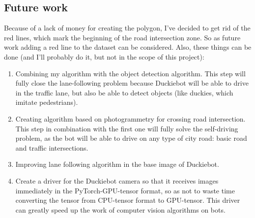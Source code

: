 \subsection{Future work}
Because of a lack of money for creating the polygon, I've decided to get rid of the red lines, which mark the beginning of the road intersection zone. So as future 
work adding a red line to the dataset can be considered. Also, these things can be done (and I'll probably do it, but not in the scope of this project):
\begin{enumerate}
    \item Combining my algorithm with the object detection algorithm. This step will fully close the lane-following problem because Duckiebot will be able to
    drive in the traffic lane, but also be able to detect objects (like duckies, which imitate pedestrians).
    \item Creating algorithm based on photogrammetry for crossing road intersection. This step in combination with the first one will fully solve the self-driving problem, 
    as the bot will be able to drive on any type of city road: basic road and traffic intersections.
    \item Improving lane following algorithm in the base image of Duckiebot.
    \item Create a driver for the Duckiebot camera so that it receives images immediately in the PyTorch-GPU-tensor format, so as not to waste time converting the tensor
    from CPU-tensor format to GPU-tensor. This driver can greatly speed up the work of computer vision algorithms on bots.
\end{enumerate}
